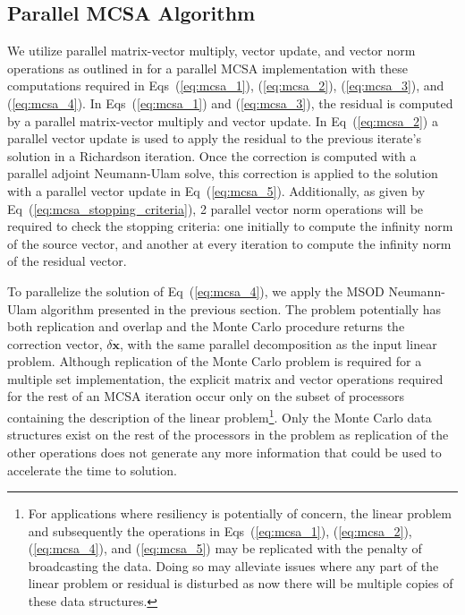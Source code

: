 \documentclass{snamc2013}
\begin{document}
\subsection{Parallel MCSA Algorithm}
We utilize parallel matrix-vector multiply, vector update, and vector
norm operations as outlined in \cite{saad_iterative_2003} for a
parallel MCSA implementation with these computations required in
Eqs~(\ref{eq:mcsa_1}), (\ref{eq:mcsa_2}), (\ref{eq:mcsa_3}), and
(\ref{eq:mcsa_4}). In Eqs~(\ref{eq:mcsa_1}) and (\ref{eq:mcsa_3}), the
residual is computed by a parallel matrix-vector multiply and vector
update. In Eq~(\ref{eq:mcsa_2}) a parallel vector update is used to
apply the residual to the previous iterate's solution in a Richardson
iteration. Once the correction is computed with a parallel adjoint
Neumann-Ulam solve, this correction is applied to the solution with a
parallel vector update in Eq~(\ref{eq:mcsa_5}). Additionally, as given
by Eq~(\ref{eq:mcsa_stopping_criteria}), 2 parallel vector norm
operations will be required to check the stopping criteria: one
initially to compute the infinity norm of the source vector, and
another at every iteration to compute the infinity norm of the
residual vector.

To parallelize the solution of Eq~(\ref{eq:mcsa_4}), we apply the MSOD
Neumann-Ulam algorithm presented in the previous section. The problem
potentially has both replication and overlap and the Monte Carlo
procedure returns the correction vector, $\delta \mathbf{x}$, with the
same parallel decomposition as the input linear problem. Although
replication of the Monte Carlo problem is required for a multiple set
implementation, the explicit matrix and vector operations required for
the rest of an MCSA iteration occur only on the subset of processors
containing the description of the linear problem\footnote{For
  applications where resiliency is potentially of concern, the linear
  problem and subsequently the operations in Eqs~(\ref{eq:mcsa_1}),
  (\ref{eq:mcsa_2}), (\ref{eq:mcsa_4}), and (\ref{eq:mcsa_5}) may be
  replicated with the penalty of broadcasting the data. Doing so may
  alleviate issues where any part of the linear problem or residual is
  disturbed as now there will be multiple copies of these data
  structures.}. Only the Monte Carlo data structures exist on the rest
of the processors in the problem as replication of the other
operations does not generate any more information that could be used
to accelerate the time to solution.

\end{document}
